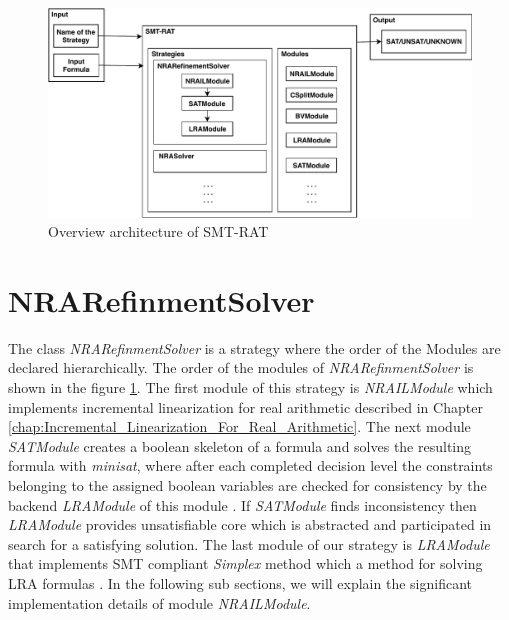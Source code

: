 \begin{figure}[ht!]
  \centering
  \includegraphics[width=.9\linewidth]{./figures/smtrat-arch.pdf}
  \caption{Overview architecture of SMT-RAT}
  \label{fig:overview_architecture_SMT-RAT}
\end{figure}


\section{NRARefinmentSolver}
\label{sec:nrarefinmentsolver}
\begin{sloppypar}
The class \textit{NRARefinmentSolver} is a strategy where the order of the Modules are declared hierarchically.
The order of the modules of \textit{NRARefinmentSolver} is shown in the figure \ref{fig:overview_architecture_SMT-RAT}.
The first module of this strategy is \textit{NRAILModule} which implements incremental linearization for real arithmetic described in Chapter \ref{chap:Incremental_Linearization_For_Real_Arithmetic}.
The next module \textit{SATModule} creates a boolean skeleton of a formula and solves the resulting formula with \textit{minisat}, where after each completed decision level the constraints belonging to the assigned boolean variables are checked for consistency by the backend \textit{LRAModule} of this module \cite{inproceedings}.
If \textit{SATModule} finds inconsistency then \textit{LRAModule} provides unsatisfiable core which is abstracted and participated in search for a satisfying solution.
The last module of our strategy is \textit{LRAModule} that implements SMT compliant \textit{Simplex} method which a method for solving LRA formulas \cite{inproceedings}.
In the following sub sections, we will explain the significant implementation details of module \textit{NRAILModule}.
\end{sloppypar}


